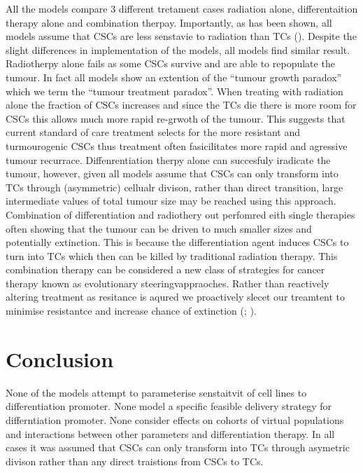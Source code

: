\documentclass[
  letterpaper,
]{scrreprt}
\theoremstyle{definition}
\theoremstyle{remark}
\begin{document}
All the models compare 3 different tretament cases radiation alone,
differentaition therapy alone and combination therpay. Importantly, as
has been shown, all models assume that CSCs are less senstavie to
radiation than TCs (). Despite
the slight differences in implementation of the models, all models find
similar result. Radiotherpy alone fails as some CSCs survive and are
able to repopulate the tumour. In fact all models show an extention of
the ``tumour growth paradox'' which we term the ``tumour treatment
paradox''. When treating with radiation alone the fraction of CSCs
increases and since the TCs die there is more room for CSCs this allows
much more rapid re-grwoth of the tumour. This suggests that current
standard of care treatment selects for the more resistant and
turmourogenic CSCs thus treatment often fasicilitates more rapid and
agressive tumour recurrace. Diffenrentiation therpy alone can succesfuly
iradicate the tumour, however, given all models assume that CSCs can
only transform into TCs through (asymmetric) cellualr divison, rather
than direct transition, large intermediate values of total tumour size
may be reached using this approach. Combination of differentiation and
radiothery out perfomred eith single therapies often showing that the
tumour can be driven to much smaller sizes and potentially extinction.
This is because the differentiation agent induces CSCs to turn into TCs
which then can be killed by traditional radiation therapy. This
combination therapy can be considered a new class of strategies for
cancer therapy known as evolutionary steeringvappraoches. Rather than
reactively altering treatment as resitance is aqured we proactively
slecet our treamtent to minimise resistantce and increase chance of
extinction (; ).


\chapter{Conclusion}\label{conclusion}

None of the models attempt to parameterise senstaitvit of cell lines to
differentiation promoter. None model a specific feasible delivery
strategy for differntiation promoter. None consider effects on cohorts
of virtual populations and interactions between other parameters and
differentiation therapy. In all cases it was assumed that CSCs can only
transform into TCs through asymetric divison rather than any direct
traistions from CSCs to TCs.
\end{document}
